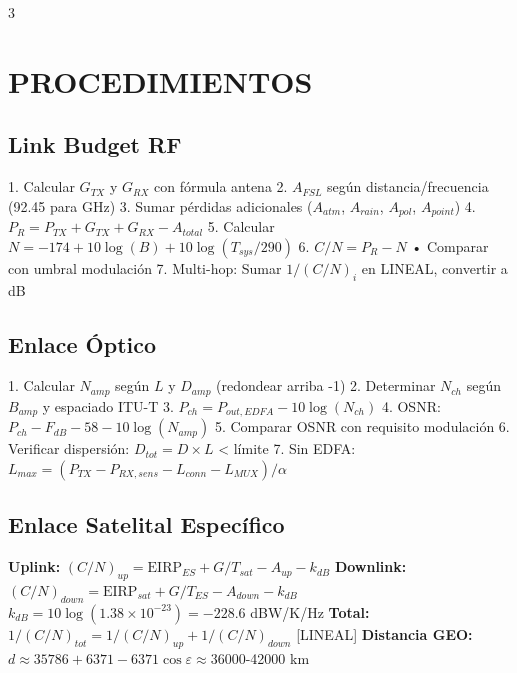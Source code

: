 \documentclass[a4paper,6pt]{extarticle}
\begin{document}
\begin{multicols}{3}
\section*{PROCEDIMIENTOS}

    \subsection*{Link Budget RF}
    1. Calcular $G_{TX}$ y $G_{RX}$ con fórmula antena
    2. $A_{FSL}$ según distancia/frecuencia (92.45 para GHz)
    3. Sumar pérdidas adicionales ($A_{atm}$, $A_{rain}$, $A_{pol}$, $A_{point}$)
    4. $P_R = P_{TX} + G_{TX} + G_{RX} - A_{total}$
    5. Calcular $N = -174 + 10\log(B) + 10\log(T_{sys}/290)$
    6. $C/N = P_R - N$ • Comparar con umbral modulación
    7. Multi-hop: Sumar $1/(C/N)_i$ en LINEAL, convertir a dB

    \subsection*{Enlace Óptico}
    1. Calcular $N_{amp}$ según $L$ y $D_{amp}$ (redondear arriba -1)
    2. Determinar $N_{ch}$ según $B_{amp}$ y espaciado ITU-T
    3. $P_{ch} = P_{out,EDFA} - 10\log(N_{ch})$
    4. OSNR: $P_{ch} - F_{dB} - 58 - 10\log(N_{amp})$
    5. Comparar OSNR con requisito modulación
    6. Verificar dispersión: $D_{tot} = D \times L$ < límite
    7. Sin EDFA: $L_{max} = (P_{TX} - P_{RX,sens} - L_{conn} - L_{MUX})/\alpha$

    \subsection*{Enlace Satelital Específico}
    \textbf{Uplink:} $(C/N)_{up} = \text{EIRP}_{ES} + G/T_{sat} - A_{up} - k_{dB}$
    \textbf{Downlink:} $(C/N)_{down} = \text{EIRP}_{sat} + G/T_{ES} - A_{down} - k_{dB}$
    $k_{dB} = 10\log(1.38\times10^{-23}) = -228.6$ dBW/K/Hz
    \textbf{Total:} $1/(C/N)_{tot} = 1/(C/N)_{up} + 1/(C/N)_{down}$ [LINEAL]
    \textbf{Distancia GEO:} $d \approx 35786 + 6371 - 6371\cos\varepsilon \approx 36000$-42000 km

    \end{multicols}

    
\end{document}
